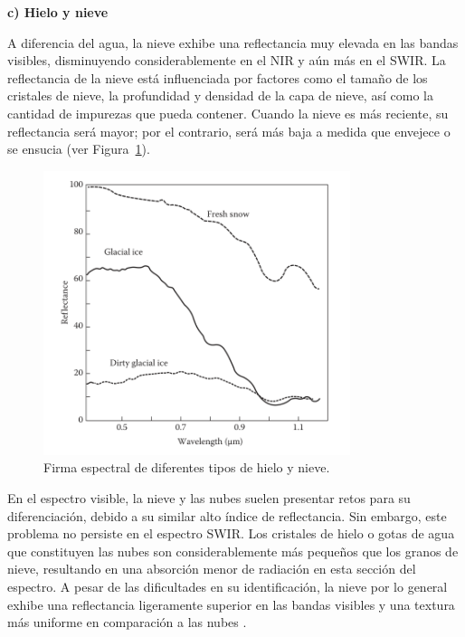 \textbf{c) Hielo y nieve}

A diferencia del agua, la nieve exhibe una reflectancia muy elevada en las bandas visibles, disminuyendo considerablemente en el NIR y aún más en el SWIR. La reflectancia de la nieve está influenciada por factores como el tamaño de los cristales de nieve, la profundidad y densidad de la capa de nieve, así como la cantidad de impurezas que pueda contener. Cuando la nieve es más reciente, su reflectancia será mayor; por el contrario, será más baja a medida que envejece o se ensucia (ver Figura~\ref{fig:CurvasReflectanciaNieve}).

\begin{figure}[H]
    \begin{center}
        \includegraphics[width=0.8\textwidth]{Images/CurvasReflectancia.png}
    \end{center}
    \caption{Firma espectral de diferentes tipos de hielo y nieve.}
    \label{fig:CurvasReflectanciaNieve}
\end{figure}

En el espectro visible, la nieve y las nubes suelen presentar retos para su diferenciación, debido a su similar alto índice de reflectancia. Sin embargo, este problema no persiste en el espectro SWIR. Los cristales de hielo o gotas de agua que constituyen las nubes son considerablemente más pequeños que los granos de nieve, resultando en una absorción menor de radiación en esta sección del espectro. A pesar de las dificultades en su identificación, la nieve por lo general exhibe una reflectancia ligeramente superior en las bandas visibles y una textura más uniforme en comparación a las nubes \cite{chuvieco2016fundamentals}.

